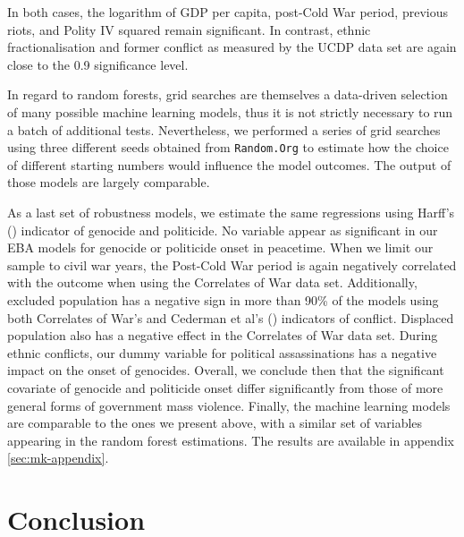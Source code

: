 In both cases, the logarithm of GDP per capita, post-Cold War period, previous riots, and Polity IV squared remain significant. In contrast, ethnic fractionalisation and former conflict as measured by the UCDP data set are again close to the 0.9 significance level. 

In regard to random forests, grid searches are themselves a data-driven selection of many possible machine learning models, thus it is not strictly necessary to run a batch of additional tests. Nevertheless, we performed a series of grid searches using three different seeds obtained from \texttt{Random.Org} to estimate how the choice of different starting numbers would influence the model outcomes. The output of those models are largely comparable.

As a last set of robustness models, we estimate the same regressions using Harff's (\citeyear{harff2003no}) indicator of genocide and politicide. No variable appear as significant in our EBA models for genocide or politicide onset in peacetime. When we limit our sample to civil war years, the Post-Cold War period is again negatively correlated with the outcome when using the Correlates of War data set. Additionally, excluded population has a negative sign in more than 90\% of the models using both Correlates of War’s and Cederman et al's (\citeyear{cederman2010ethnic}) indicators of conflict. Displaced population also has a negative effect in the Correlates of War data set. During ethnic conflicts, our dummy variable for political assassinations has a negative impact on the onset of genocides. Overall, we conclude then that the significant covariate of genocide and politicide onset differ significantly from those of more general forms of government mass violence. Finally, the machine learning models are comparable to the ones we present above, with a similar set of variables appearing in the random forest estimations. The results are available in appendix \ref{sec:mk-appendix}.

\section{Conclusion}
\label{sec:conclusion4}

